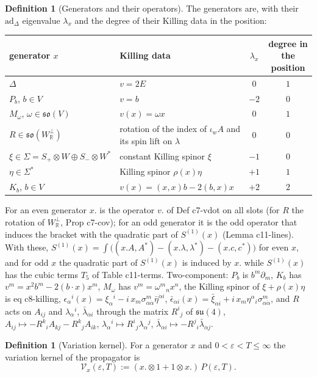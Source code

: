 \documentclass[11pt]{article}
\numberwithin{equation}{section}
\theoremstyle{plain}
\theoremstyle{definition}
\newtheorem{definition}[theorem]{Definition}
\newcommand{\Var}{\mathcal V}
\begin{document}
\begin{definition}[Generators and their operators]
\label{def:op-gens}
The generators are, with their $\mathrm{ad}_\Delta$ eigenvalue $\lambda_x$ and the degree of their Killing data in the position:
\begin{center}
\begin{tabular}{l|l|c|c}
generator $x$ & Killing data & $\lambda_x$ & degree in the position\\
\hline
$\Delta$ & $v=2E$ & $0$ & $1$\\
$P_b$, $b\in V$ & $v=b$ & $-2$ & $0$\\
$M_\omega$, $\omega\in\mathfrak{so}(V)$ & $v(x)=\omega x$ & $0$ & $1$\\
$R\in\mathfrak{so}(W_{\mathbb R}^\perp)$ & rotation of the index of $\iota_wA$ and its spin lift on $\lambda$ & $0$ & $0$\\
$\xi\in\Sigma=S_+\otimes W\oplus S_-\otimes W^*$ & constant Killing spinor $\xi$ & $-1$ & $0$\\
$\eta\in\Sigma^*$ & Killing spinor $\rho(x)\eta$ & $+1$ & $1$\\
$K_b$, $b\in V$ & $v(x)=(x,x)b-2(b,x)x$ & $+2$ & $2$
\end{tabular}
\end{center}
For an even generator $x.$ is the operator $v.$ of Def c7-vdot on all slots (for $R$ the rotation of $W_{\mathbb R}^\perp$, Prop c7-cov); for an odd generator it is the odd operator that induces the bracket with the quadratic part of $S^{(1)}(x)$ (Lemma c11-lines). With these, $S^{(1)}(x)=\int\big((x.A,A^*)-(x.\lambda,\lambda^*)-(x.c,c^*)\big)$ for even $x$, and for odd $x$ the quadratic part of $S^{(1)}(x)$ is induced by $x.$ while $S^{(1)}(x)$ has the cubic terms $T_5$ of Table c11-terms. Two-component: $P_b$ is $b^m\partial_m$, $K_b$ has $v^m=x^2b^m-2(b\cdot x)x^m$, $M_\omega$ has $v^m=\omega^m{}_nx^n$, the Killing spinor of $\xi+\rho(x)\eta$ is eq c8-killing, $\epsilon_\alpha{}^i(x)=\xi_\alpha{}^i-i\,x_m\sigma^m_{\alpha\dot\alpha}\bar\eta^{\dot\alpha i}$, $\bar\epsilon_{\dot\alpha i}(x)=\bar\xi_{\dot\alpha i}+i\,x_m\eta^\alpha{}_i\sigma^m_{\alpha\dot\alpha}$, and $R$ acts on $A_{ij}$ and $\lambda_\alpha{}^i$, $\bar\lambda_{\dot\alpha i}$ through the matrix $R^i{}_j$ of $\mathfrak{su}(4)$, $A_{ij}\mapsto-R^k{}_iA_{kj}-R^k{}_jA_{ik}$, $\lambda_\alpha{}^i\mapsto R^i{}_j\lambda_\alpha{}^j$, $\bar\lambda_{\dot\alpha i}\mapsto-R^j{}_i\bar\lambda_{\dot\alpha j}$.
\end{definition}

\begin{definition}[Variation kernel]
\label{def:op-var}
For a generator $x$ and $0<\varepsilon<T\le\infty$ the variation kernel of the propagator is
\[
\Var_x(\varepsilon,T):=(x.\otimes1+1\otimes x.)\,P(\varepsilon,T).
\]
\end{definition}
\end{document}
